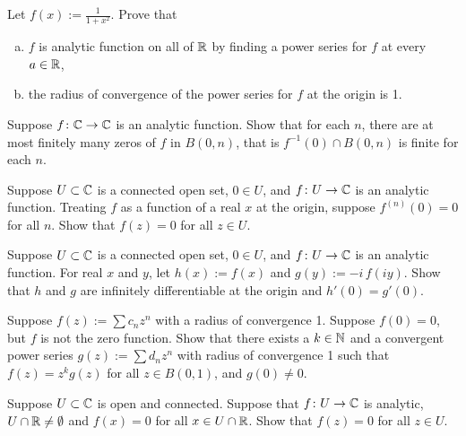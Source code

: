 \begin{exercise}
Let $f(x) := \frac{1}{1+x^2}$.  Prove that
\begin{enumerate}[a)]
\item
$f$ is analytic function on all of ${\mathbb{R}}$
by finding a power series for $f$ at every $a \in {\mathbb{R}}$,
\item
the radius of convergence of
the power series for $f$ at the origin is 1.
\end{enumerate}
\end{exercise}


\begin{exercise}
Suppose $f \colon {\mathbb{C}} \to {\mathbb{C}}$ is an analytic function.  Show that for each
$n$, there are at most finitely many zeros of $f$ in $B(0,n)$, that is
$f^{-1}(0) \cap B(0,n)$ is finite for each $n$.
\end{exercise}

\begin{exercise}
Suppose $U \subset {\mathbb{C}}$ is a connected open set, $0 \in U$, and $f \colon U
\to {\mathbb{C}}$ is an analytic function.  Treating $f$ as a function of a real $x$
at the origin, suppose $f^{(n)}(0) = 0$ for all $n$.  Show that $f(z) = 0$
for all $z \in U$.
\end{exercise}

\begin{exercise}
Suppose $U \subset {\mathbb{C}}$ is a connected open set, $0 \in U$, and $f \colon U
\to {\mathbb{C}}$ is an analytic function.  For real $x$ and $y$,
let $h(x) := f(x)$ and $g(y) := -i \, f(iy)$.
Show that $h$ and $g$ are infinitely differentiable at the origin and
$h'(0) = g'(0)$.
\end{exercise}

\begin{exercise}
Suppose $f(z) := \sum c_n z^n$ with a radius of convergence 1.  Suppose $f(0)
= 0$, but $f$ is not the zero function.
Show that there exists a $k \in {\mathbb{N}}$ and a convergent
power series $g(z) := \sum d_n z^n$ with radius of convergence 1
such that $f(z) = z^k g(z)$ for all $z \in B(0,1)$, and $g(0) \not= 0$.
\end{exercise}

\begin{exercise}
Suppose $U \subset {\mathbb{C}}$ is open and connected.  Suppose that
$f \colon U \to {\mathbb{C}}$ is analytic, $U \cap {\mathbb{R}} \not= \emptyset$ and
$f(x) = 0$ for all $x \in U \cap {\mathbb{R}}$.  Show that $f(z) = 0$ for all $z \in
U$.
\end{exercise}


